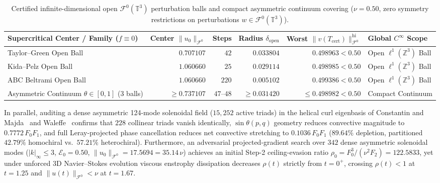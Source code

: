 \documentclass[11pt]{article}
\theoremstyle{plain}
\theoremstyle{definition}
\begin{document}
\begin{table}[htbp]
\centering
\caption{Certified infinite-dimensional open $\mathcal{F}^0(\mathbb{T}^3)$ perturbation balls and compact asymmetric continuum covering ($\nu = 0.50$, zero symmetry restrictions on perturbations $w \in \mathcal{F}^0(\mathbb{T}^3)$).}\label{tab:step3}
\vspace{4pt}
{\small\setlength{\tabcolsep}{4pt}
\begin{tabular}{@{}lrrrrl@{}}
\toprule
Supercritical Center / Family ($f \equiv 0$) & Center $\|u_0\|_{\mathcal{F}^0}$ & Steps & Radius $\delta_{\mathrm{open}}$ & Worst $\|v(T_{\mathrm{cert}})\|_{\mathcal{F}^0}^{\mathrm{hi}}$ & Global $C^\infty$ Scope \\
\midrule
Taylor--Green Open Ball          & $0.707107$ & $42$  & $0.033804$ & $0.498963 < 0.50$ & Open $\ell^1(\mathbb{Z}^3)$ Ball \\
Kida--Pelz Open Ball             & $1.060660$ & $25$  & $0.029114$ & $0.498985 < 0.50$ & Open $\ell^1(\mathbb{Z}^3)$ Ball \\
ABC Beltrami Open Ball           & $1.060660$ & $220$ & $0.005102$ & $0.499386 < 0.50$ & Open $\ell^1(\mathbb{Z}^3)$ Ball \\
Asymmetric Continuum $\theta \in [0,1]$ ($3$ balls) & $\ge 0.737107$ & $47\text{--}48$ & $\ge 0.031420$ & $\le 0.498982 < 0.50$ & Compact Continuum \\
\bottomrule
\end{tabular}}
\end{table}

In parallel, auditing a dense asymmetric 124-mode solenoidal field ($15{,}252$ active triads) in the helical curl eigenbasis of Constantin and Majda~\cite{constantinmajda1988} and Waleffe~\cite{waleffe1992,biferale2012} confirms that $228$ collinear triads vanish identically, $\sin\theta(p,q)$ geometry reduces convective magnitude to $0.7772\,F_0 F_1$, and full Leray-projected phase cancellation reduces net convective stretching to $0.1036\,F_0 F_1$ ($89.64\%$ depletion, partitioned $42.79\%$ homochiral vs.\ $57.21\%$ heterochiral). Furthermore, an adversarial projected-gradient search over $342$ dense asymmetric solenoidal modes ($|k|_\infty \le 3$, $\mathcal{E}_0 = 0.50$, $\|u_0\|_{\mathcal{F}^0} = 17.5694 = 35.14\,\nu$) achieves an initial Step-2 ceiling-evasion ratio $\rho_0 = F_0^3 / (\nu^2 F_2) = 122.5833$, yet under unforced 3D Navier--Stokes evolution viscous enstrophy dissipation decreases $\rho(t)$ strictly from $t = 0^+$, crossing $\rho(t) < 1$ at $t = 1.25$ and $\|u(t)\|_{\mathcal{F}^0} < \nu$ at $t = 1.67$.
\end{document}

